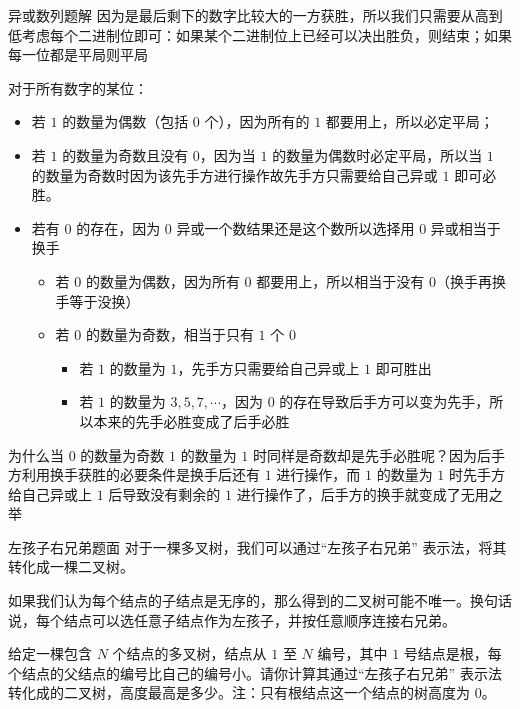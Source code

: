 \documentclass{pptt}
\begin{document}
\begin{frame}{异或数列}{题解}
    因为是最后剩下的数字比较大的一方获胜，所以我们只需要从高到低考虑每个二进制位即可：如果某个二进制位上已经可以决出胜负，则结束；如果每一位都是平局则平局

    对于所有数字的某位：

    \begin{itemize}
        \item 若 $1$ 的数量为偶数（包括 $0$ 个），因为所有的 $1$ 都要用上，所以必定平局；
        \item 若 $1$ 的数量为奇数且没有 $0$，因为当 $1$ 的数量为偶数时必定平局，所以当 $1$ 的数量为奇数时因为该先手方进行操作故先手方只需要给自己异或 $1$ 即可必胜。
        \item 若有 $0$ 的存在，因为 $0$ 异或一个数结果还是这个数所以选择用 $0$ 异或相当于换手
              \begin{itemize}
                  \item 若 $0$ 的数量为偶数，因为所有 $0$ 都要用上，所以相当于没有 $0$（换手再换手等于没换）
                  \item 若 $0$ 的数量为奇数，相当于只有 $1$ 个 $0$
                        \begin{itemize}
                            \item 若 $1$ 的数量为 $1$，先手方只需要给自己异或上 $1$ 即可胜出
                            \item 若 $1$ 的数量为 $3,5,7,\cdots$，因为 $0$ 的存在导致后手方可以变为先手，所以本来的先手必胜变成了后手必胜
                        \end{itemize}
              \end{itemize}
    \end{itemize}

    为什么当 $0$ 的数量为奇数 $1$ 的数量为 $1$ 时同样是奇数却是先手必胜呢？因为后手方利用换手获胜的必要条件是换手后还有 $1$ 进行操作，而 $1$ 的数量为 $1$ 时先手方给自己异或上 $1$ 后导致没有剩余的 $1$ 进行操作了，后手方的换手就变成了无用之举
\end{frame}

\begin{frame}{左孩子右兄弟}{题面}
    对于一棵多叉树，我们可以通过“左孩子右兄弟” 表示法，将其转化成一棵二叉树。

    如果我们认为每个结点的子结点是无序的，那么得到的二叉树可能不唯一。换句话说，每个结点可以选任意子结点作为左孩子，并按任意顺序连接右兄弟。

    给定一棵包含 $N$ 个结点的多叉树，结点从 $1$ 至 $N$ 编号，其中 $1$ 号结点是根，每个结点的父结点的编号比自己的编号小。请你计算其通过“左孩子右兄弟” 表示法转化成的二叉树，高度最高是多少。注：只有根结点这一个结点的树高度为 $0$。
\end{frame}
\end{document}
